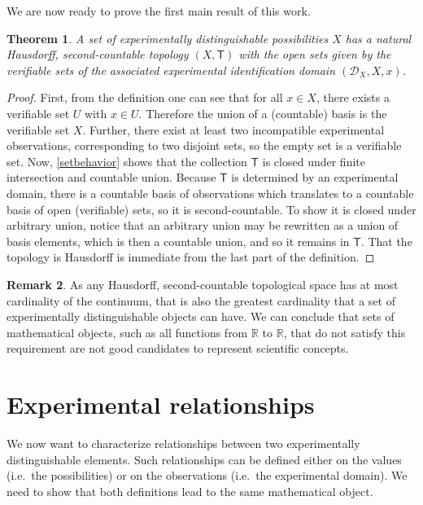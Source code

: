 \documentclass{amsart}
\newtheorem{thm}{Theorem}[section]
\theoremstyle{definition}
\newtheorem{rem}[thm]{Remark}
\numberwithin{equation}{section}
\begin{document}
We are now ready to prove the first main result of this work.

\begin{thm}
A set of experimentally distinguishable possibilities $X$ has a natural Hausdorff, second-countable topology $(X,\mathsf{T})$ with the open sets given by the verifiable sets of the associated experimental identification domain $(\mathcal{D}_X, X, x)$.
\end{thm}
\begin{proof}
First, from the definition one can see that for all $x\in X$, there exists a verifiable set $U$ with $x\in U$. Therefore the union of a (countable) basis is the verifiable set $X$. Further, there exist at least two incompatible experimental observations, corresponding to two disjoint sets, so the empty set is a verifiable set. Now, \ref{setbehavior} shows that the collection $\mathsf{T}$ is closed under finite intersection and countable union. Because $\mathsf{T}$ is determined by an experimental domain, there is a countable basis of observations which translates to a countable basis of open (verifiable) sets, so it is second-countable. To show it is closed under arbitrary union, notice that an arbitrary union may be rewritten as a union of basis elements, which is then a countable union, and so it remains in $\mathsf{T}$. That the topology is Hausdorff is immediate from the last part of the definition. 
\end{proof}

\begin{rem}
As any Hausdorff, second-countable topological space has at most cardinality of the continuum, that is also the greatest cardinality that a set of experimentally distinguishable objects can have. We can conclude that sets of mathematical objects, such as all functions from $\mathbb{R}$ to $\mathbb{R}$, that do not satisfy this requirement are not good candidates to represent scientific concepts.
\end{rem}

\section{\bf Experimental relationships}

We now want to characterize relationships between two experimentally distinguishable elements. Such relationships can be defined either on the values (i.e.~the possibilities) or on the observations (i.e.~the experimental domain). We need to show that both definitions lead to the same mathematical object.
\end{document}
